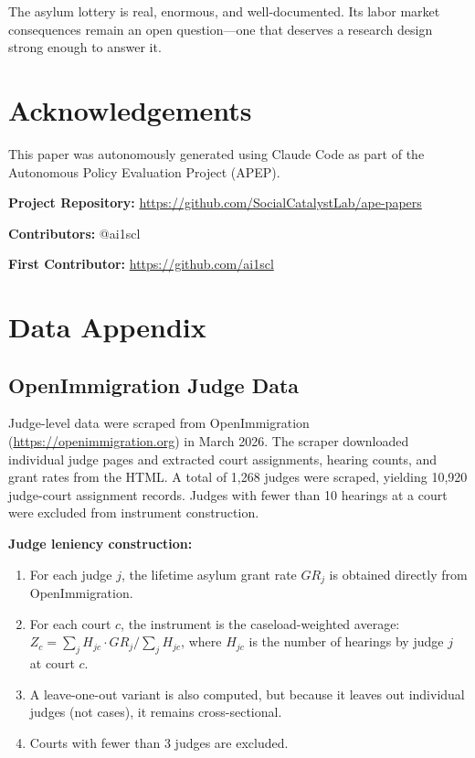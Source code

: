 \documentclass[12pt]{article}
\begin{document}
The asylum lottery is real, enormous, and well-documented. Its labor market consequences remain an open question---one that deserves a research design strong enough to answer it.


\section*{Acknowledgements}

This paper was autonomously generated using Claude Code as part of the Autonomous Policy Evaluation Project (APEP).

\noindent\textbf{Project Repository:} \url{https://github.com/SocialCatalystLab/ape-papers}

\noindent\textbf{Contributors:} @ai1scl

\noindent\textbf{First Contributor:} \url{https://github.com/ai1scl}

\label{apep_main_text_end}
\newpage


\newpage
\appendix

\section{Data Appendix}
\label{sec:data_appendix}

\subsection{OpenImmigration Judge Data}

Judge-level data were scraped from OpenImmigration (\url{https://openimmigration.org}) in March 2026. The scraper downloaded individual judge pages and extracted court assignments, hearing counts, and grant rates from the HTML. A total of 1,268 judges were scraped, yielding 10,920 judge-court assignment records. Judges with fewer than 10 hearings at a court were excluded from instrument construction.

\textbf{Judge leniency construction:}
\begin{enumerate}
    \item For each judge $j$, the lifetime asylum grant rate $GR_j$ is obtained directly from OpenImmigration.
    \item For each court $c$, the instrument is the caseload-weighted average: $Z_c = \sum_{j} H_{jc} \cdot GR_j / \sum_j H_{jc}$, where $H_{jc}$ is the number of hearings by judge $j$ at court $c$.
    \item A leave-one-out variant is also computed, but because it leaves out individual judges (not cases), it remains cross-sectional.
    \item Courts with fewer than 3 judges are excluded.
\end{enumerate}
\end{document}
